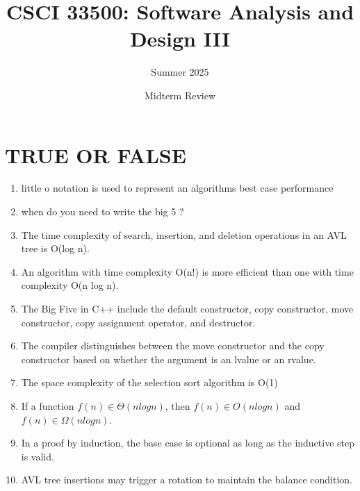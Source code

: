 \documentclass[a4paper]{article}
\title{CSCI 33500: Software Analysis and Design III}
\author{Summer 2025}
\date{Midterm Review}
\begin{document}
\maketitle


\section{TRUE OR FALSE}
\begin{enumerate}
    \item little o notation is used to represent an algorithms best case performance
    \item when do you need to write the big 5 ? 
    \item The time complexity of search, insertion, and deletion operations in an AVL tree is O(log n).
    \item An algorithm with time complexity O(n!) is more efficient than one with time complexity O(n log n).
    \item The Big Five in C++ include the default constructor, copy constructor, move constructor, copy assignment operator, and destructor.
    \item The compiler distinguishes between the move constructor and the copy constructor based on whether the argument is an lvalue or an rvalue.
    \item The space complexity of the selection sort algorithm is O(1)
    \item If a function $f(n) \in \Theta(n log n)$, then $f(n) \in O(n log n)$ and $f(n) \in \Omega(n log n)$.
    \item In a proof by induction, the base case is optional as long as the inductive step is valid.
    \item AVL tree insertions may trigger a rotation to maintain the balance condition. 
\end{enumerate}
\newpage
\end{document}
